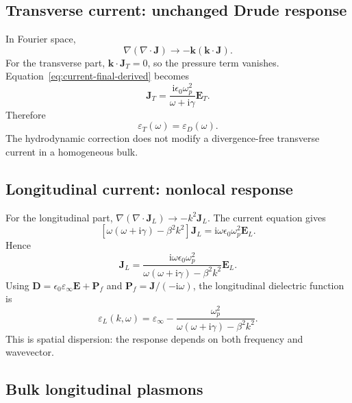 \documentclass[11pt,a4paper]{article}
\newcommand{\E}{\mathbf E}
\newcommand{\Dfield}{\mathbf D}
\newcommand{\J}{\mathbf J}
\newcommand{\Pfield}{\mathbf P}
\newcommand{\ii}{\mathrm i}
\newcommand{\eps}{\varepsilon}
\newcommand{\epsinf}{\varepsilon_\infty}
\newcommand{\epst}{\varepsilon_T}
\newcommand{\epsl}{\varepsilon_L}
\newcommand{\omegap}{\omega_p}
\begin{document}
\subsection{Transverse current: unchanged Drude response}

In Fourier space,
\begin{equation}
    \nabla(\nabla\!\cdot\!\J)
    \longrightarrow -\mathbf k(\mathbf k\!\cdot\!\J).
    \label{eq:pressure-fourier-again}
\end{equation}
For the transverse part, \(\mathbf k\!\cdot\!\J_T=0\), so the pressure term
vanishes.  Equation~\eqref{eq:current-final-derived} becomes
\begin{equation}
    \J_T
    =\frac{\ii\epsilon_0\omegap^2}{\omega+\ii\gamma}\E_T.
    \label{eq:JT}
\end{equation}
Therefore
\begin{equation}
    \boxed{\epst(\omega)=\eps_D(\omega).}
    \label{eq:epsilon-transverse}
\end{equation}
The hydrodynamic correction does not modify a divergence-free transverse
current in a homogeneous bulk.

\subsection{Longitudinal current: nonlocal response}

For the longitudinal part,
\(\nabla(\nabla\!\cdot\!\J_L)\to-k^2\J_L\).  The current equation gives
\begin{equation}
    \left[\omega(\omega+\ii\gamma)-\beta^2k^2\right]\J_L
    =\ii\omega\epsilon_0\omegap^2\E_L.
    \label{eq:JL-equation}
\end{equation}
Hence
\begin{equation}
    \J_L
    =\frac{\ii\omega\epsilon_0\omegap^2}
           {\omega(\omega+\ii\gamma)-\beta^2k^2}\E_L.
    \label{eq:JL-response}
\end{equation}
Using \(\Dfield=\epsilon_0\epsinf\E+\Pfield_f\) and
\(\Pfield_f=\J/(-\ii\omega)\), the longitudinal dielectric function is
\begin{equation}
    \boxed{
    \epsl(k,\omega)
    =\epsinf-
      \frac{\omegap^2}
      {\omega(\omega+\ii\gamma)-\beta^2k^2}.
    }
    \label{eq:epsilon-longitudinal}
\end{equation}
This is spatial dispersion: the response depends on both frequency and
wavevector.

\subsection{Bulk longitudinal plasmons}
\end{document}
